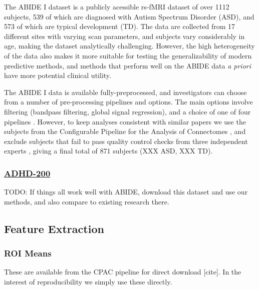 \documentclass[10pt]{article}
\begin{document}
The ABIDE I dataset \citep{dimartinoAutismBrainImaging2014} is a publicly acessible rs-fMRI dataset of over
1112 subjects, 539 of which are diagnosed with Autism Spectrum Disorder (ASD),
and 573 of which are typical development (TD). The data are collected from 17 different sites with
varying scan parameters, and subjects vary considerably in age, making the dataset analytically
challenging. However, the high heterogeneity of the data also makes it more suitable for testing the
generalizability of modern predictive methods, and methods that perform well on the ABIDE data
\emph{a priori} have more potential clinical utility.

The ABIDE I data is available fully-preprocessed, and investigators can choose from a number of
pre-processing pipelines and options. The main options involve filtering (bandpass filtering, global
signal regression), and a choice of one of four pipelines \citep{dimartinoAutismBrainImaging2014}.
However, to keep analyses consistent with similar papers
\citet{abrahamDerivingReproducibleBiomarkers2017, mostafaDiagnosisAutismSpectrum2019,
yinDiagnosisAutismSpectrum2021, heinsfeldIdentificationAutismSpectrum2018} we use the subjects from
the Configurable Pipeline for the Analysis of Connectomes
\citep[CPAC;][]{cameronAutomatedAnalysisConnectomes2013}, and exclude subjects that fail to pass quality
control checks from three independent experts \citep[see][for
details]{abrahamDerivingReproducibleBiomarkers2017}, giving a final total of 871 subjects (XXX ASD,
XXX TD).

\subsubsection{\href{http://preprocessed-connectomes-project.org/adhd200/}{ADHD-200}}

TODO: If things all work well with ABIDE, download this dataset and use our methods, and also
compare to existing research there.



\subsection{Feature Extraction}
\subsubsection{ROI Means}

These are available from the CPAC pipeline for direct download [cite]. In the interest of reproducibility we simply
use these directly.
\end{document}
